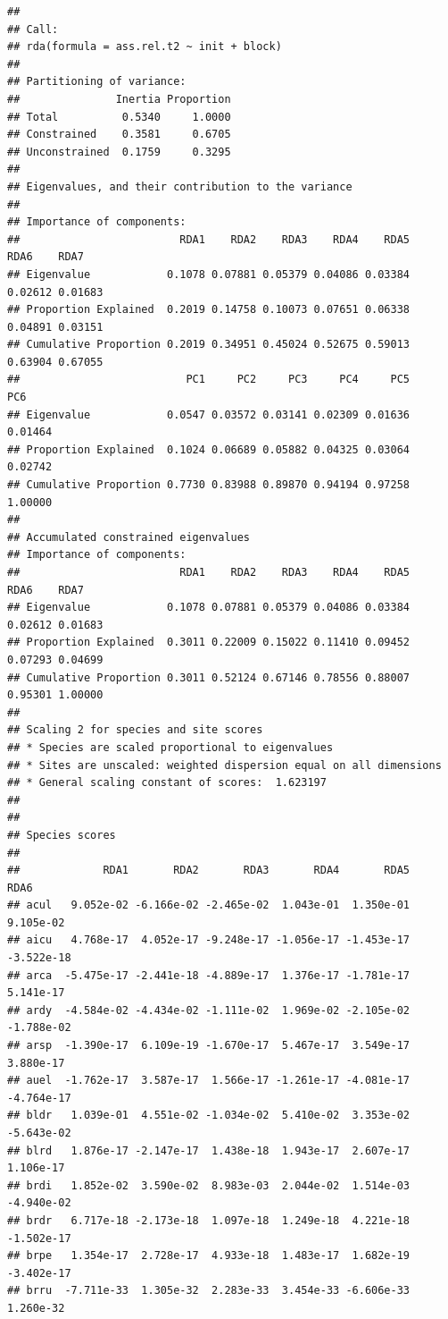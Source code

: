 \documentclass[
]{article}
\begin{document}
\begin{verbatim}
## 
## Call:
## rda(formula = ass.rel.t2 ~ init + block) 
## 
## Partitioning of variance:
##               Inertia Proportion
## Total          0.5340     1.0000
## Constrained    0.3581     0.6705
## Unconstrained  0.1759     0.3295
## 
## Eigenvalues, and their contribution to the variance 
## 
## Importance of components:
##                         RDA1    RDA2    RDA3    RDA4    RDA5    RDA6    RDA7
## Eigenvalue            0.1078 0.07881 0.05379 0.04086 0.03384 0.02612 0.01683
## Proportion Explained  0.2019 0.14758 0.10073 0.07651 0.06338 0.04891 0.03151
## Cumulative Proportion 0.2019 0.34951 0.45024 0.52675 0.59013 0.63904 0.67055
##                          PC1     PC2     PC3     PC4     PC5     PC6
## Eigenvalue            0.0547 0.03572 0.03141 0.02309 0.01636 0.01464
## Proportion Explained  0.1024 0.06689 0.05882 0.04325 0.03064 0.02742
## Cumulative Proportion 0.7730 0.83988 0.89870 0.94194 0.97258 1.00000
## 
## Accumulated constrained eigenvalues
## Importance of components:
##                         RDA1    RDA2    RDA3    RDA4    RDA5    RDA6    RDA7
## Eigenvalue            0.1078 0.07881 0.05379 0.04086 0.03384 0.02612 0.01683
## Proportion Explained  0.3011 0.22009 0.15022 0.11410 0.09452 0.07293 0.04699
## Cumulative Proportion 0.3011 0.52124 0.67146 0.78556 0.88007 0.95301 1.00000
## 
## Scaling 2 for species and site scores
## * Species are scaled proportional to eigenvalues
## * Sites are unscaled: weighted dispersion equal on all dimensions
## * General scaling constant of scores:  1.623197 
## 
## 
## Species scores
## 
##             RDA1       RDA2       RDA3       RDA4       RDA5       RDA6
## acul   9.052e-02 -6.166e-02 -2.465e-02  1.043e-01  1.350e-01  9.105e-02
## aicu   4.768e-17  4.052e-17 -9.248e-17 -1.056e-17 -1.453e-17 -3.522e-18
## arca  -5.475e-17 -2.441e-18 -4.889e-17  1.376e-17 -1.781e-17  5.141e-17
## ardy  -4.584e-02 -4.434e-02 -1.111e-02  1.969e-02 -2.105e-02 -1.788e-02
## arsp  -1.390e-17  6.109e-19 -1.670e-17  5.467e-17  3.549e-17  3.880e-17
## auel  -1.762e-17  3.587e-17  1.566e-17 -1.261e-17 -4.081e-17 -4.764e-17
## bldr   1.039e-01  4.551e-02 -1.034e-02  5.410e-02  3.353e-02 -5.643e-02
## blrd   1.876e-17 -2.147e-17  1.438e-18  1.943e-17  2.607e-17  1.106e-17
## brdi   1.852e-02  3.590e-02  8.983e-03  2.044e-02  1.514e-03 -4.940e-02
## brdr   6.717e-18 -2.173e-18  1.097e-18  1.249e-18  4.221e-18 -1.502e-17
## brpe   1.354e-17  2.728e-17  4.933e-18  1.483e-17  1.682e-19 -3.402e-17
## brru  -7.711e-33  1.305e-32  2.283e-33  3.454e-33 -6.606e-33  1.260e-32

\end{verbatim}
\end{document}

